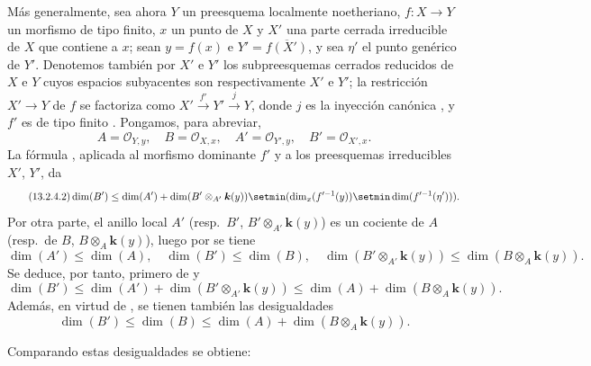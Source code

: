 \begin{env}[13.2.4]
\label{IV.13.2.4}
Más generalmente, sea ahora $Y$ un preesquema localmente noetheriano, $f:X\to Y$ un morfismo de tipo finito, $x$ un punto de $X$ y $X'$ una parte cerrada irreducible de $X$ que contiene a $x$; sean $y=f(x)$ e $Y'=\overline{f(X')}$, y sea $\eta'$ el punto genérico de $Y'$.
Denotemos también por $X'$ e $Y'$ los subpreesquemas cerrados reducidos de $X$ e $Y$ cuyos espacios subyacentes son respectivamente $X'$ e $Y'$; la restricción $X'\to Y$ de $f$ se factoriza como $X'\xrightarrow{f'}Y'\xrightarrow{j}Y$, donde $j$ es la inyección canónica , y $f'$ es de tipo finito .
Pongamos, para abreviar,
\[
\tag{13.2.4.1}
\label{IV.13.2.4.1-fr}
  A=\mathcal O_{Y,y},\quad B=\mathcal O_{X,x},\quad
  A'=\mathcal O_{Y',y},\quad B'=\mathcal O_{X',x}.
\]
La fórmula , aplicada al morfismo dominante $f'$ y a los preesquemas irreducibles $X'$, $Y'$, da
\[
\tag{13.2.4.2}
\label{IV.13.2.4.2-fr}
  \dim(B')\leq\dim(A')+\dim(B'\otimes_{A'}\boldsymbol{k}(y))
  \setmin(\dim_x(f'^{-1}(y))\setmin\dim(f'^{-1}(\eta'))).
\]
Por otra parte, el anillo local $A'$ (resp.\ $B'$, $B'\otimes_{A'}\boldsymbol{k}(y)$) es un cociente de $A$ (resp.\ de $B$, $B\otimes_A\boldsymbol{k}(y)$), luego por  se tiene
\[
\tag{13.2.4.3}
\label{IV.13.2.4.3-fr}
  \dim(A')\leq\dim(A),\quad \dim(B')\leq\dim(B),\quad
  \dim(B'\otimes_{A'}\boldsymbol{k}(y))\leq\dim(B\otimes_A\boldsymbol{k}(y)).
\]
Se deduce, por tanto, primero de  y 
\[
\tag{13.2.4.4}
\label{IV.13.2.4.4-fr}
  \dim(B')\leq\dim(A')+\dim(B'\otimes_{A'}\boldsymbol{k}(y))
  \leq\dim(A)+\dim(B\otimes_A\boldsymbol{k}(y)).
\]
Además, en virtud de , se tienen también las desigualdades
\[
\tag{13.2.4.5}
\label{IV.13.2.4.5-fr}
  \dim(B')\leq\dim(B)\leq\dim(A)+\dim(B\otimes_A\boldsymbol{k}(y)).
\]
\end{env}


Comparando estas desigualdades se obtiene:

